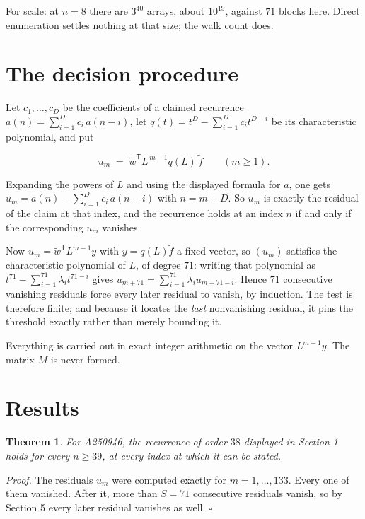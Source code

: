 \documentclass[11pt]{article}
\newtheorem{theorem}{Theorem}
\theoremstyle{definition}
\begin{document}
For scale: at $n = 8$ there are $3^{40}$ arrays, about $10^{19}$, against $71$ blocks here. Direct enumeration settles nothing at that size; the walk count does.

\section{The decision procedure}

Let $c_1,\dots,c_D$ be the coefficients of a claimed recurrence $a(n) = \sum_{i=1}^{D} c_i\,a(n-i)$, let $q(t) = t^{D} - \sum_{i=1}^{D} c_i t^{D-i}$ be its characteristic polynomial, and put

\[u_m \;=\; \tilde w^{\mathsf T} L^{\,m-1} q(L)\,\tilde f \qquad (m \ge 1).\]

Expanding the powers of $L$ and using the displayed formula for $a$, one gets $u_m = a(n) - \sum_{i=1}^{D} c_i\,a(n-i)$ with $n = m + D$. So $u_m$ is exactly the residual of the claim at that index, and the recurrence holds at an index $n$ if and only if the corresponding $u_m$ vanishes.

Now $u_m = \tilde w^{\mathsf T} L^{m-1} y$ with $y = q(L)\tilde f$ a fixed vector, so $(u_m)$ satisfies the characteristic polynomial of $L$, of degree $71$: writing that polynomial as $t^{71} - \sum_{i=1}^{71} \lambda_i t^{71-i}$ gives $u_{m+71} = \sum_{i=1}^{71} \lambda_i u_{m+71-i}$. Hence $71$ consecutive vanishing residuals force every later residual to vanish, by induction. The test is therefore finite; and because it locates the {\itshape last} nonvanishing residual, it pins the threshold exactly rather than merely bounding it.

Everything is carried out in exact integer arithmetic on the vector $L^{m-1}y$. The matrix $M$ is never formed.

\section{Results}

\begin{theorem} For A250946, the recurrence of order $38$ displayed in Section 1 holds for every $n \ge 39$, at every index at which it can be stated.\end{theorem}

{\itshape Proof.} The residuals $u_m$ were computed exactly for $m = 1,\dots,133$. Every one of them vanished. After it, more than $S = 71$ consecutive residuals vanish, so by Section 5 every later residual vanishes as well. $\square$
\end{document}
